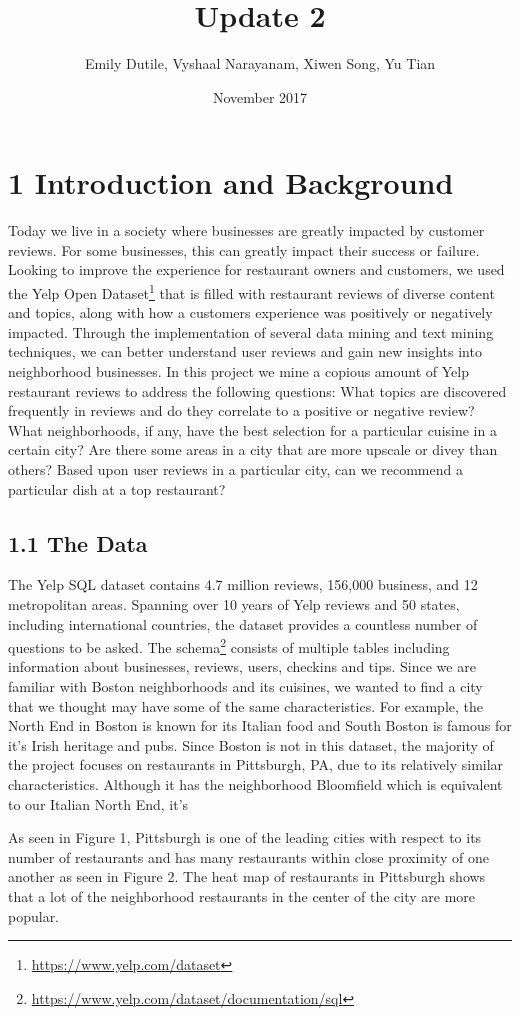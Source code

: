 \documentclass{neu_handout}
\title{Update 2}
\author{Emily Dutile, Vyshaal Narayanam, Xiwen Song, Yu Tian}
\date{November 2017}
\begin{document}
\section*{1 Introduction and Background}
Today we live in a society where businesses are greatly impacted by customer reviews. For some businesses, this can greatly impact their success or failure. Looking to improve the
experience for restaurant owners and customers, we used the Yelp Open Dataset\footnote{\url{https://www.yelp.com/dataset}} that is filled with restaurant reviews of diverse content and topics, along with how a customers experience was positively or negatively impacted. Through the implementation of several data mining and text mining techniques, we can better understand user reviews and gain new insights into neighborhood businesses. In this project we mine a copious amount of Yelp restaurant reviews to address the following questions: What topics are discovered frequently in reviews and do they correlate to a positive or negative review? What neighborhoods, if any, have the best selection for a particular cuisine in a certain city? Are there some areas in a city that are more upscale or divey than others? Based upon user reviews in a particular city, can we recommend a particular dish at a top restaurant?

\subsection*{1.1 The Data}
The Yelp SQL dataset contains 4.7 million reviews, 156,000 business, and 12 metropolitan areas. Spanning over 10 years of Yelp reviews and 50 states, including international countries, the dataset provides a countless number of questions to be asked. The schema\footnote{\url{https://www.yelp.com/dataset/documentation/sql}} consists of multiple tables including information about businesses, reviews, users, checkins and tips. Since we are familiar with Boston neighborhoods and its cuisines, we wanted to find a city that we thought may have some of the same characteristics. For example, the North End in Boston is known for its Italian food and South Boston is famous for it's Irish heritage and pubs. Since Boston is not in this dataset, the majority of the project focuses on restaurants in Pittsburgh, PA, due to its relatively similar characteristics. Although it has the neighborhood Bloomfield which is equivalent to our Italian North End, it's 

As seen in Figure 1, Pittsburgh is one of the leading cities with respect to its number of restaurants and has many restaurants within close proximity of one another as seen in Figure 2. The heat map of restaurants in Pittsburgh shows that a lot of the neighborhood restaurants in the center of the city are more popular.
\end{document}
